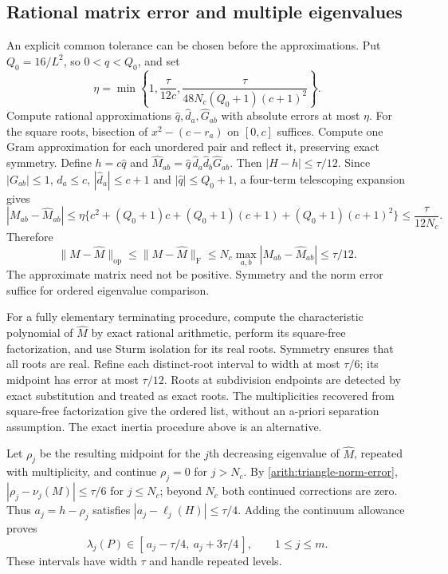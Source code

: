 \documentclass[11pt,reqno]{amsart}
\numberwithin{equation}{section}
\newcommand{\norm}[1]{\lVert#1\rVert}
\begin{document}
\subsection{Rational matrix error and multiple eigenvalues}
\label{arith:triangle-errors}

An explicit common tolerance can be chosen before the
approximations.  Put $Q_0=16/L^2$, so $0<q<Q_0$, and set
\begin{equation}\label{arith:triangle-entry-budget}
 \eta=\min\left\{1,\frac{\tau}{12c},
       \frac{\tau}{48N_c(Q_0+1)(c+1)^2}\right\}.
\end{equation}
Compute rational approximations $\widehat q,\widehat d_a,
\widehat G_{ab}$ with absolute errors at most $\eta$.
For the square roots, bisection of $x^2-(c-r_a)$ on $[0,c]$
suffices.  Compute one Gram approximation for each unordered
pair and reflect it, preserving exact symmetry.  Define
$h=c\widehat q$ and
$\widehat M_{ab}=\widehat q\,\widehat d_a\widehat d_b
\widehat G_{ab}$.  Then $|H-h|\le\tau/12$.
Since $|G_{ab}|\le1$, $d_a\le c$,
$|\widehat d_a|\le c+1$ and
$|\widehat q|\le Q_0+1$, a four-term telescoping expansion gives
\[
 |M_{ab}-\widehat M_{ab}|
 \le\eta\{c^2+(Q_0+1)c+(Q_0+1)(c+1)
                              +(Q_0+1)(c+1)^2\}
 \le\frac{\tau}{12N_c}.
\]
Therefore
\begin{equation}\label{arith:triangle-norm-error}
 \norm{M-\widehat M}_{\mathrm{op}}
 \le\norm{M-\widehat M}_{\mathrm F}
 \le N_c\max_{a,b}|M_{ab}-\widehat M_{ab}|
 \le\tau/12.
\end{equation}
The approximate matrix need not be positive.  Symmetry and
the norm error suffice for ordered eigenvalue comparison.

For a fully elementary terminating procedure, compute the
characteristic polynomial of $\widehat M$ by exact rational
arithmetic, perform its square-free factorization, and use
Sturm isolation for its real roots.  Symmetry ensures that
all roots are real.  Refine each distinct-root interval to
width at most $\tau/6$; its midpoint has error at most
$\tau/12$.  Roots at subdivision endpoints are detected by
exact substitution and treated as exact roots.  The
multiplicities recovered from square-free factorization give
the ordered list, without an a-priori separation assumption.
The exact inertia procedure above is an alternative.

Let $\rho_j$ be the resulting midpoint for the $j$th decreasing
eigenvalue of $\widehat M$, repeated with multiplicity, and
continue $\rho_j=0$ for $j>N_c$.  By
\eqref{arith:triangle-norm-error},
$|\rho_j-\nu_j(M)|\le\tau/6$ for $j\le N_c$; beyond $N_c$
both continued corrections are zero.  Thus
$a_j=h-\rho_j$ satisfies $|a_j-\ell_j(H)|\le\tau/4$.
Adding the continuum allowance proves
\begin{equation}\label{arith:triangle-output}
 \boxed{\quad
 \lambda_j(P)\in
 [\,a_j-\tau/4,\ a_j+3\tau/4\,],\qquad 1\le j\le m.
 \quad}
\end{equation}
These intervals have width $\tau$ and handle repeated levels.
\end{document}
